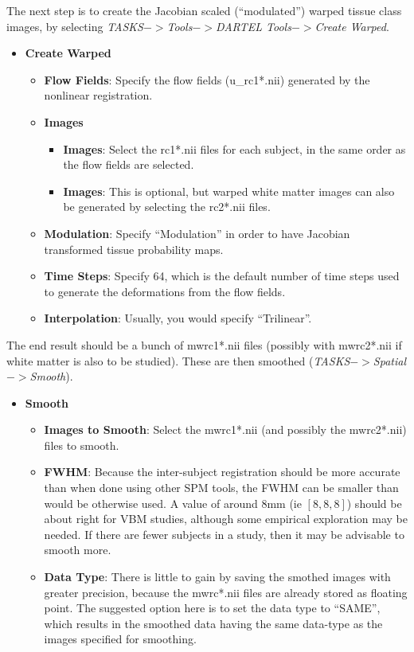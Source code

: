 The next step is to create the Jacobian scaled (``modulated'') warped tissue class images, by selecting \emph{TASKS$->$Tools$->$DARTEL Tools$->$Create Warped}.
\begin{itemize}
\item{{\bf Create Warped}
  \begin{itemize}
  \item{{\bf Flow Fields}: Specify the flow fields (u\_rc1*.nii) generated by the nonlinear registration.
  }
  \item{{\bf Images}
    \begin{itemize}
    \item{{\bf Images}: Select the rc1*.nii files for each subject, in the same order as the flow fields are selected.
    }
    \item{{\bf Images}: This is optional, but warped white matter images can also be generated by selecting the rc2*.nii files.
    }
    \end{itemize}
  }
  \item{{\bf Modulation}: Specify ``Modulation'' in order to have Jacobian transformed tissue probability maps.
  }
  \item{{\bf Time Steps}: Specify 64, which is the default number of time steps used to generate the deformations from the flow fields.
  }
  \item{{\bf Interpolation}: Usually, you would specify ``Trilinear''.
  }
  \end{itemize}
}
\end{itemize}

The end result should be a bunch of mwrc1*.nii files (possibly with mwrc2*.nii if white matter is also to be studied). These are then smoothed (\emph{TASKS$->$Spatial$->$Smooth}).
\begin{itemize}
\item{{\bf Smooth}
  \begin{itemize}
  \item{{\bf Images to Smooth}: Select the mwrc1*.nii (and possibly the mwrc2*.nii) files to smooth.
  }
  \item{{\bf FWHM}: Because the inter-subject registration should be more accurate than when done using other SPM tools, the FWHM can be smaller than would be otherwise used.  A value of around 8mm (ie $[8, 8, 8]$) should be about right for VBM studies, although some empirical exploration may be needed.  If there are fewer subjects in a study, then it may be advisable to smooth more.
  }
  \item{{\bf Data Type}: There is little to gain by saving the smothed images with greater precision, because the mwrc*.nii files are already stored as floating point. The suggested option here is to set the data type to ``SAME'', which results in the smoothed data having the same data-type as the images specified for smoothing.
  }
  \end{itemize}
}
\end{itemize}

